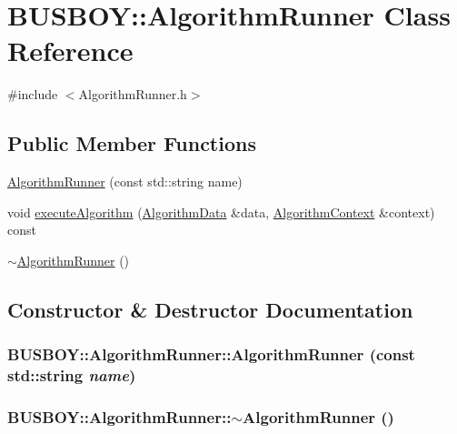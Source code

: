 \hypertarget{classBUSBOY_1_1AlgorithmRunner}{
\section{BUSBOY::AlgorithmRunner Class Reference}
\label{classBUSBOY_1_1AlgorithmRunner}
}


{\ttfamily \#include $<$AlgorithmRunner.h$>$}\subsection*{Public Member Functions}
\begin{DoxyCompactItemize}
\item 
\hyperlink{classBUSBOY_1_1AlgorithmRunner_adc71f4c451824ffa4ea3312c3b09f01f}{AlgorithmRunner} (const std::string name)
\item 
void \hyperlink{classBUSBOY_1_1AlgorithmRunner_aa41dc0a176b15078a37988c560d3b6a3}{executeAlgorithm} (\hyperlink{classBUSBOY_1_1AlgorithmData}{AlgorithmData} \&data, \hyperlink{classBUSBOY_1_1AlgorithmContext}{AlgorithmContext} \&context) const 
\item 
\hyperlink{classBUSBOY_1_1AlgorithmRunner_a1bcb6c0ba3d67fe5bf9e0aa6fb96f183}{$\sim$AlgorithmRunner} ()
\end{DoxyCompactItemize}


\subsection{Constructor \& Destructor Documentation}
\hypertarget{classBUSBOY_1_1AlgorithmRunner_adc71f4c451824ffa4ea3312c3b09f01f}{
\subsubsection[{AlgorithmRunner}]{\setlength{\rightskip}{0pt plus 5cm}BUSBOY::AlgorithmRunner::AlgorithmRunner (const std::string {\em name})}}
\label{classBUSBOY_1_1AlgorithmRunner_adc71f4c451824ffa4ea3312c3b09f01f}
\hypertarget{classBUSBOY_1_1AlgorithmRunner_a1bcb6c0ba3d67fe5bf9e0aa6fb96f183}{
\subsubsection[{$\sim$AlgorithmRunner}]{\setlength{\rightskip}{0pt plus 5cm}BUSBOY::AlgorithmRunner::$\sim$AlgorithmRunner ()}}
\label{classBUSBOY_1_1AlgorithmRunner_a1bcb6c0ba3d67fe5bf9e0aa6fb96f183}


